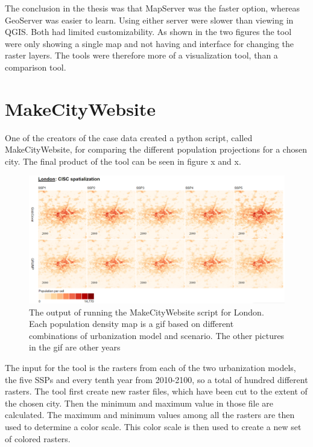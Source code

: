 The conclusion in the thesis was that MapServer was the faster option, whereas GeoServer was easier to learn. Using either server were slower than viewing in QGIS. Both had limited customizability. As shown in the two figures the tool were only showing a single map and not having and interface for changing the raster layers. The tools were therefore more of a visualization tool, than a comparison tool.



\section{MakeCityWebsite}
One of the creators of the case data created a python script, called MakeCityWebsite, for comparing the different population projections for a chosen city.  The final product of the tool can be seen in figure x and x. 

\begin{figure} [H]
	\centering
	\includegraphics[width=1\textwidth]{Pictures/MakeCityWebsite1}
	\caption{The output of running the MakeCityWebsite script for London. Each population density map is a gif based on different combinations of urbanization model and scenario. The other pictures in the gif are other years}
	\label{MakeCityWebsite1}
\end{figure}

The input for the tool is the rasters from each of the two urbanization models, the five SSPs and every tenth year from 2010-2100, so a total of hundred different rasters.
The tool first create new raster files, which have been cut to the extent of the chosen city. Then the minimum and maximum value in those file are calculated. The maximum and minimum values among all the rasters are then used to determine a color scale. This color scale is then used to create a new set of colored rasters.

